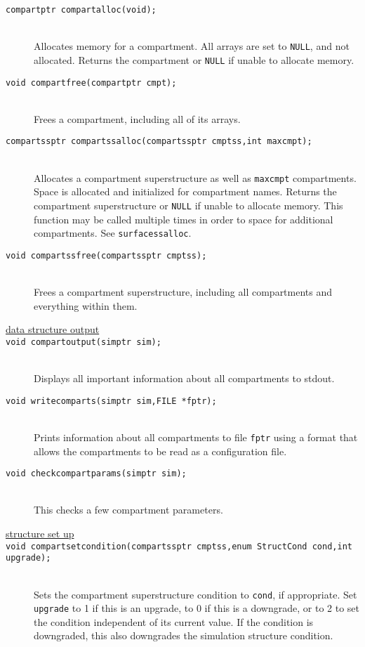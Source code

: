 \documentclass {book}
\begin{document}
\begin{description}
\item[\texttt{compartptr compartalloc(void);}]
\hfill \\
Allocates memory for a compartment. All arrays are set to \texttt{NULL}, and not allocated. Returns the compartment or \texttt{NULL} if unable to allocate memory.

\item[\texttt{void compartfree(compartptr cmpt);}]
\hfill \\
Frees a compartment, including all of its arrays.

\item[\texttt{compartssptr compartssalloc(compartssptr cmptss,int maxcmpt);}]
\hfill \\
Allocates a compartment superstructure as well as \texttt{maxcmpt} compartments. Space is allocated and initialized for compartment names. Returns the compartment superstructure or \texttt{NULL} if unable to allocate memory. This function may be called multiple times in order to space for additional compartments. See \texttt{surfacessalloc}.

\item[\texttt{void compartssfree(compartssptr cmptss);}]
\hfill \\
Frees a compartment superstructure, including all compartments and everything within them.

\item[\underline{data structure output}]

\item[\texttt{void compartoutput(simptr sim);}]
\hfill \\
Displays all important information about all compartments to stdout.

\item[\texttt{void writecomparts(simptr sim,FILE *fptr);}]
\hfill \\
Prints information about all compartments to file \texttt{fptr} using a format that allows the compartments to be read as a configuration file.

\item[\texttt{void checkcompartparams(simptr sim);}]
\hfill \\
This checks a few compartment parameters.

\item[\underline{structure set up}]

\item[\texttt{void compartsetcondition(compartssptr cmptss,enum StructCond cond,int upgrade);}]
\hfill \\
Sets the compartment superstructure condition to \texttt{cond}, if appropriate. Set \texttt{upgrade} to 1 if this is an upgrade, to 0 if this is a downgrade, or to 2 to set the condition independent of its current value. If the condition is downgraded, this also downgrades the simulation structure condition.


\end{description}
\end{document}
